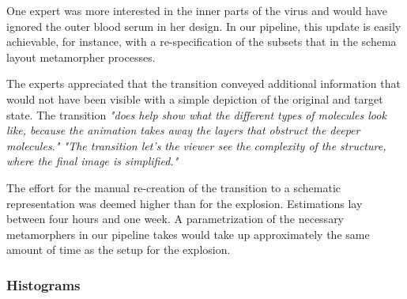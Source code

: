 One expert was more interested in the inner parts of the virus and would have ignored the outer blood serum in her design. In our pipeline, this update is easily achievable, for instance, with a re-specification of the subsets that in the schema layout metamorpher processes. 

The experts appreciated that the transition conveyed additional information that would not have been visible with a simple depiction of the original and target state.
The transition \textit{"does help show what the different types of molecules look like, because the animation takes away the layers that obstruct the deeper molecules."
"The transition let's the viewer see the complexity of the structure, where the final image is simplified."}








The effort for the manual re-creation of the transition to a schematic representation was deemed higher than for the explosion. Estimations lay between four hours and one week. A parametrization of the necessary metamorphers in our pipeline takes would take up approximately the same amount of time as the setup for the explosion.









\subsubsection{Histograms}


